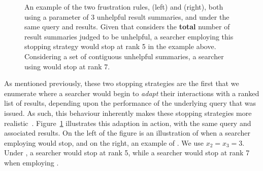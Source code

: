 \begin{figure}[t!]
    \centering
    \caption[Examples of frustration rules  and ]{An example of the two frustration rules,  (left) and  (right), both using a parameter of 3 unhelpful result summaries, and under the same query and results. Given that  considers the \textbf{total} number of result summaries judged to be unhelpful, a searcher employing this stopping strategy would stop at rank 5 in the example above. Considering a set of contiguous unhelpful summaries, a searcher using  would stop at rank 7.}
    \label{fig:ss23}
\end{figure}

As mentioned previously, these two stopping strategies are the first that we enumerate where a searcher would begin to \emph{adapt} their interactions with a ranked list of results, depending upon the performance of the underlying query that was issued. As such, this behaviour inherently makes these stopping strategies more realistic~\cite{moffat2013users_versus_models}. Figure~\ref{fig:ss23} illustrates this adaption in action, with the same query and associated results. On the left of the figure is an illustration of when a searcher employing  would stop, and on the right, an example of . We use $x_2 = x_3 = 3$. Under , a searcher would stop at rank 5, while a searcher would stop at rank 7 when employing .

